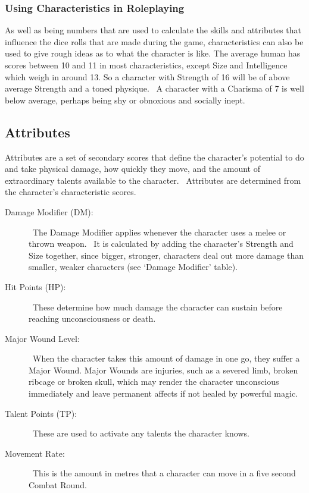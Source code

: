 \subsubsection{Using Characteristics in Roleplaying}
As well as being numbers that are used to calculate the skills and attributes that influence the dice rolls that are made during the game, characteristics can also be used to give rough ideas as to what the character is like. The average human has scores between 10 and 11 in most characteristics, except Size and Intelligence which weigh in around 13. So a character with Strength of 16 will be of above average Strength and a toned physique.  A character with a Charisma of 7 is well below average, perhaps being shy or obnoxious and socially inept. 


\subsection{Attributes}
Attributes are a set of secondary scores that define the character’s potential to do and take physical damage, how quickly they move, and the amount of extraordinary talents available to the character.  Attributes are determined from the character’s characteristic scores. 

\begin{description}
	\item[Damage Modifier (DM):] The Damage Modifier applies whenever the character uses a melee or thrown weapon.  It is calculated by adding the character’s Strength and Size together, since bigger, stronger, characters deal out more damage than smaller, weaker characters (see `Damage Modifier' table). 
	\item[Hit Points (HP):] These determine how much damage the character can sustain before reaching unconsciousness or death.
	\item[Major Wound Level:] When the character takes this amount of damage in one go, they suffer a Major Wound. Major Wounds are injuries, such as a severed limb, broken ribcage or broken skull, which may render the character unconscious immediately and leave permanent affects if not healed by powerful magic.
	\item[Talent Points (TP):] These are used to activate any talents the character knows. 
	\item[Movement Rate:] This is the amount in metres that a character can move in a five second Combat Round.
\end{description}

